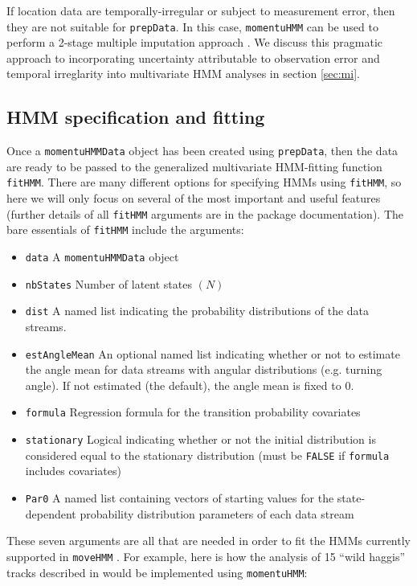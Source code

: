 \documentclass[12pt]{article}\usepackage[]{graphicx}\usepackage[]{color}
\begin{document}
If location data are temporally-irregular or subject to measurement error, then they are not suitable for \verb|prepData|. In this case, \verb|momentuHMM| can be used to perform a 2-stage multiple imputation approach \citep{McClintock2017}. We discuss this pragmatic approach to incorporating uncertainty attributable to observation error and temporal irreglarity into multivariate HMM analyses in section \ref{sec:mi}.

\subsection{HMM specification and fitting}
Once a \verb|momentuHMMData| object has been created using \verb|prepData|, then the data are ready to be passed to the generalized multivariate HMM-fitting function \verb|fitHMM|. There are many different options for specifying HMMs using \verb|fitHMM|, so here we will only focus on several of the most important and useful features (further details of all \verb|fitHMM| arguments are in the package documentation). The bare essentials of \verb|fitHMM| include the arguments:
\begin{itemize}
  \item{\verb|data|} A \verb|momentuHMMData| object
  \item{\verb|nbStates|} Number of latent states $(N)$
  \item{\verb|dist|} A named list indicating the probability distributions of the data streams.
  \item{\verb|estAngleMean|} An optional named list indicating whether or not to estimate the angle mean for data streams with angular distributions (e.g. turning angle). If not estimated (the default), the angle mean is fixed to 0.
  \item{\verb|formula|} Regression formula for the transition probability covariates
  \item{\verb|stationary|} Logical indicating whether or not the initial distribution is considered equal to the stationary distribution (must be \verb|FALSE| if \verb|formula| includes covariates) 
  \item{\verb|Par0|} A named list containing vectors of starting values for the state-dependent probability distribution parameters of each data stream
\end{itemize}
These seven arguments are all that are needed in order to fit the HMMs currently supported in \verb|moveHMM| \citep{MichelotEtAl2016}. For example, here is how the analysis of 15 ``wild haggis'' tracks described in \cite{MichelotEtAl2016} would be implemented using \verb|momentuHMM|:
\end{document}

